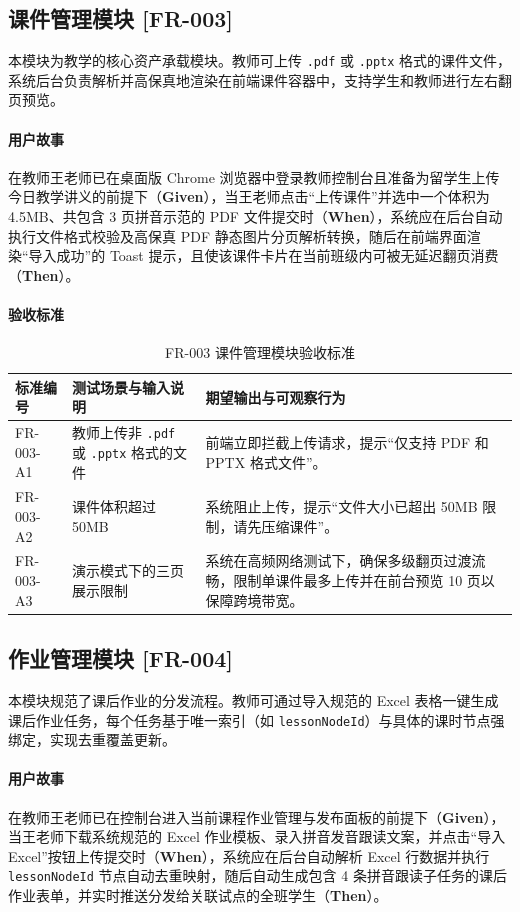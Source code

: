 \subsection{课件管理模块 [FR-003]}
本模块为教学的核心资产承载模块。教师可上传 \texttt{.pdf} 或 \texttt{.pptx} 格式的课件文件，系统后台负责解析并高保真地渲染在前端课件容器中，支持学生和教师进行左右翻页预览。
\paragraph{用户故事}
在教师王老师已在桌面版 Chrome 浏览器中登录教师控制台且准备为留学生上传今日教学讲义的前提下（\textbf{Given}），当王老师点击“上传课件”并选中一个体积为 4.5MB、共包含 3 页拼音示范的 PDF 文件提交时（\textbf{When}），系统应在后台自动执行文件格式校验及高保真 PDF 静态图片分页解析转换，随后在前端界面渲染“导入成功”的 Toast 提示，且使该课件卡片在当前班级内可被无延迟翻页消费（\textbf{Then}）。
\paragraph{验收标准}
\begin{table}[H]
\centering
\caption{FR-003 课件管理模块验收标准}
\begin{tabularx}{\textwidth}{l p{5.5cm} X}
\toprule
\textbf{标准编号} & \textbf{测试场景与输入说明} & \textbf{期望输出与可观察行为} \\
\midrule
FR-003-A1 & 教师上传非 \texttt{.pdf} 或 \texttt{.pptx} 格式的文件 & 前端立即拦截上传请求，提示“仅支持 PDF 和 PPTX 格式文件”。 \\
FR-003-A2 & 课件体积超过 50MB & 系统阻止上传，提示“文件大小已超出 50MB 限制，请先压缩课件”。 \\
FR-003-A3 & 演示模式下的三页展示限制 & 系统在高频网络测试下，确保多级翻页过渡流畅，限制单课件最多上传并在前台预览 10 页以保障跨境带宽。 \\
\bottomrule
\end{tabularx}
\end{table}

\subsection{作业管理模块 [FR-004]}
本模块规范了课后作业的分发流程。教师可通过导入规范的 Excel 表格一键生成课后作业任务，每个任务基于唯一索引（如 \texttt{lessonNodeId}）与具体的课时节点强绑定，实现去重覆盖更新。
\paragraph{用户故事}
在教师王老师已在控制台进入当前课程作业管理与发布面板的前提下（\textbf{Given}），当王老师下载系统规范的 Excel 作业模板、录入拼音发音跟读文案，并点击“导入 Excel”按钮上传提交时（\textbf{When}），系统应在后台自动解析 Excel 行数据并执行 \texttt{lessonNodeId} 节点自动去重映射，随后自动生成包含 4 条拼音跟读子任务的课后作业表单，并实时推送分发给关联试点的全班学生（\textbf{Then}）。
